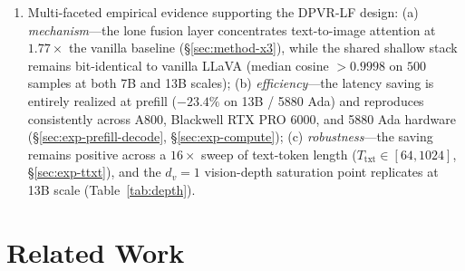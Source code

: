\documentclass[a4paper,fleqn,review]{cas-sc}
\newcommand{\dpvrlf}{DPVR-LF}
\begin{document}
\begin{enumerate}
\item Multi-faceted empirical evidence supporting the \dpvrlf{}
design: (a) \emph{mechanism}---the lone fusion layer concentrates
text-to-image attention at $1.77\times$ the vanilla baseline
(\S\ref{sec:method-x3}), while the shared shallow stack remains
bit-identical to vanilla LLaVA (median cosine $> 0.9998$ on $500$
samples at both 7B and 13B scales); (b) \emph{efficiency}---the
latency saving is entirely realized at prefill ($-23.4\%$ on
13B / 5880 Ada) and reproduces consistently across A800,
Blackwell RTX PRO 6000, and 5880 Ada hardware
(\S\ref{sec:exp-prefill-decode}, \S\ref{sec:exp-compute});
(c) \emph{robustness}---the saving remains positive across a
$16\times$ sweep of text-token length
($T_{\mathrm{txt}} \in [64, 1024]$,
\S\ref{sec:exp-ttxt}), and the $d_v = 1$ vision-depth saturation
point replicates at 13B scale (Table~\ref{tab:depth}).
%
\end{enumerate}

\section{Related Work}\label{sec:related}
\end{document}
